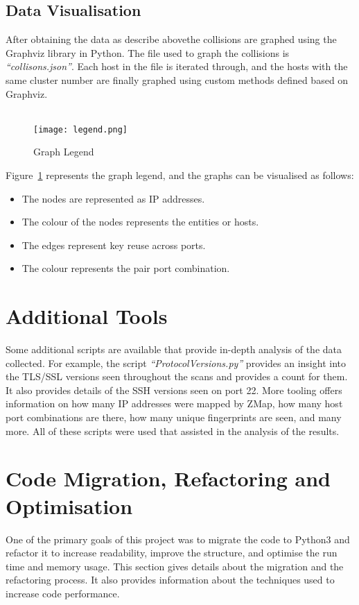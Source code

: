 \subsection{Data Visualisation}
After obtaining the data as describe abovethe collisions are graphed using the Graphviz library in Python. The file used to graph the 
collisions is \textit{``collisons.json''}. Each host in the file is iterated through, and the hosts with the same cluster number are finally graphed using custom 
methods defined based on Graphviz.\\\\
\pagebreak
\begin{figure}[h!]
    \centering
    \texttt{[image: legend.png]}
    \caption{Graph Legend}
    \label{fig:graphsleg}
\end{figure}

\noindent Figure~\ref*{fig:graphsleg} represents the graph legend, and the graphs can be visualised as follows:

\begin{itemize}
    \item The nodes are represented as IP addresses.
    \item The colour of the nodes represents the entities or hosts.
    \item The edges represent key reuse across ports. 
    \item The colour represents the pair port combination. 
\end{itemize}  

\section{Additional Tools}
\label{additions}
Some additional scripts are available that provide in-depth analysis of the data collected. For example, the script \textit{``ProtocolVersions.py''} 
provides an insight into the TLS/SSL versions seen throughout the scans and provides a count for them. It also provides details of 
the SSH versions seen on port 22. More tooling offers information on how many IP addresses were mapped by ZMap, how many host port 
combinations are there, how many unique fingerprints are seen, and many more. All of these scripts were used that assisted in the analysis of the results.

\section{Code Migration, Refactoring and Optimisation}
\label{refactoring}
One of the primary goals of this project was to migrate the code to Python3 and refactor it to increase readability, improve the structure, 
and optimise the run time and memory usage. This section gives details about the migration and the refactoring process. It also provides 
information about the techniques used to increase code performance.

